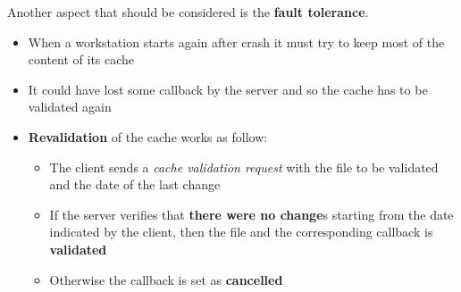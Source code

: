 Another aspect that should be considered is the \textbf{fault tolerance}. 
\begin{itemize}
    \item When a workstation starts again after crash it must try to keep most of the content of its cache
    \item It could have lost some callback by the server and so the cache has to be validated again
    \item \textbf{Revalidation} of the cache works as follow:
    \begin{itemize}
        \item The client sends a \textit{cache validation request} with the file to be validated and the date of the last change
        \item If the server verifies that \textbf{there were no change}s starting from the date indicated by the client, then the file and the corresponding callback is \textbf{validated}
        \item Otherwise the callback is set as \textbf{cancelled}
    \end{itemize}
\end{itemize}
